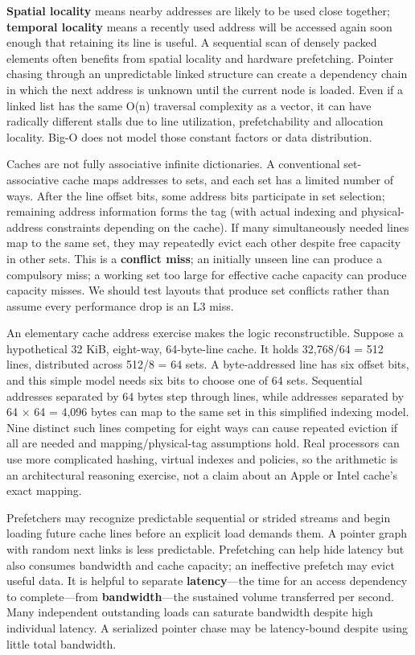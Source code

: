 \textbf{Spatial locality} means nearby addresses are likely to be used close together; \textbf{temporal locality} means a recently used address will be accessed again soon enough that retaining its line is useful. A sequential scan of densely packed elements often benefits from spatial locality and hardware prefetching. Pointer chasing through an unpredictable linked structure can create a dependency chain in which the next address is unknown until the current node is loaded. Even if a linked list has the same O(n) traversal complexity as a vector, it can have radically different stalls due to line utilization, prefetchability and allocation locality. Big-O does not model those constant factors or data distribution.

Caches are not fully associative infinite dictionaries. A conventional set-associative cache maps addresses to sets, and each set has a limited number of ways. After the line offset bits, some address bits participate in set selection; remaining address information forms the tag (with actual indexing and physical-address constraints depending on the cache). If many simultaneously needed lines map to the same set, they may repeatedly evict each other despite free capacity in other sets. This is a \textbf{conflict miss}; an initially unseen line can produce a compulsory miss; a working set too large for effective cache capacity can produce capacity misses. We should test layouts that produce set conflicts rather than assume every performance drop is an L3 miss.

An elementary cache address exercise makes the logic reconstructible. Suppose a hypothetical 32 KiB, eight-way, 64-byte-line cache. It holds 32,768/64 = 512 lines, distributed across 512/8 = 64 sets. A byte-addressed line has six offset bits, and this simple model needs six bits to choose one of 64 sets. Sequential addresses separated by 64 bytes step through lines, while addresses separated by 64 × 64 = 4,096 bytes can map to the same set in this simplified indexing model. Nine distinct such lines competing for eight ways can cause repeated eviction if all are needed and mapping/physical-tag assumptions hold. Real processors can use more complicated hashing, virtual indexes and policies, so the arithmetic is an architectural reasoning exercise, not a claim about an Apple or Intel cache's exact mapping.

Prefetchers may recognize predictable sequential or strided streams and begin loading future cache lines before an explicit load demands them. A pointer graph with random next links is less predictable. Prefetching can help hide latency but also consumes bandwidth and cache capacity; an ineffective prefetch may evict useful data. It is helpful to separate \textbf{latency}---the time for an access dependency to complete---from \textbf{bandwidth}---the sustained volume transferred per second. Many independent outstanding loads can saturate bandwidth despite high individual latency. A serialized pointer chase may be latency-bound despite using little total bandwidth.


